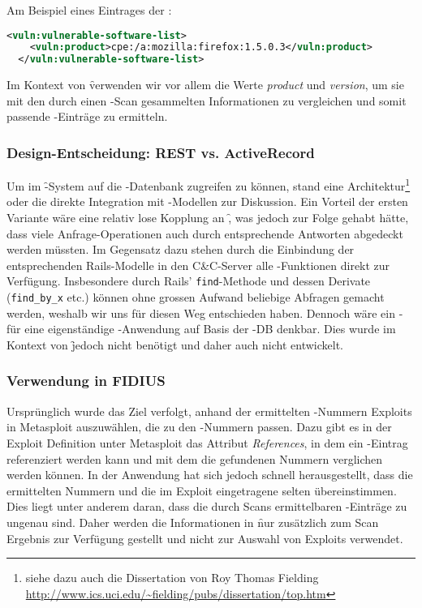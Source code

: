 Am Beispiel eines Eintrages der :

\begin{lstlisting}[language=XML]
  <vuln:vulnerable-software-list>
    <vuln:product>cpe:/a:mozilla:firefox:1.5.0.3</vuln:product>
  </vuln:vulnerable-software-list>
\end{lstlisting}

Im Kontext von \f verwenden wir vor allem die Werte \textit{product} und
\textit{version}, um sie mit den durch einen -Scan gesammelten
Informationen zu vergleichen und somit passende -Einträge zu ermitteln.

\subsubsection{Design-Entscheidung: REST vs. ActiveRecord}
\label{sec:design-entsch-rest}

Um im \f-System auf die -Datenbank zugreifen zu können, stand
eine 
Architektur\footnote{ siehe dazu auch die Dissertation von Roy Thomas
  Fielding \url{http://www.ics.uci.edu/~fielding/pubs/dissertation/top.htm}}
oder die direkte Integration mit -Modellen zur
Diskussion. Ein Vorteil der ersten Variante wäre eine relativ lose
Kopplung an \f, was jedoch zur Folge gehabt hätte, dass viele
Anfrage-Operationen auch durch entsprechende Antworten abgedeckt
werden müssten. Im Gegensatz dazu stehen durch die Einbindung der
entsprechenden Rails-Modelle in den C\&C-Server
alle -Funktionen direkt zur Verfügung. Insbesondere durch
Rails' \texttt{find}-Methode und dessen Derivate (\texttt{find\_by\_x} etc.)
können ohne grossen Aufwand beliebige Abfragen gemacht werden, weshalb
wir uns für diesen Weg entschieden haben. Dennoch wäre ein
- für eine eigenständige
-Anwendung auf Basis der -DB denkbar. Dies wurde im
Kontext von \f jedoch nicht benötigt und daher auch nicht entwickelt.

\subsubsection{Verwendung in FIDIUS}
\label{sec:use-in-fidius}

Ursprünglich wurde das Ziel verfolgt, anhand der ermittelten -Nummern
Exploits in Metasploit auszuwählen, die zu den -Nummern passen. Dazu
gibt es in der Exploit Definition unter Metasploit das Attribut
\textit{References}, in dem ein -Eintrag referenziert werden kann und
mit dem die gefundenen Nummern verglichen werden können. In der Anwendung hat
sich jedoch schnell herausgestellt, dass die ermittelten Nummern und die im
Exploit eingetragene selten übereinstimmen. Dies liegt unter anderem daran, dass
die durch  Scans ermittelbaren -Einträge zu ungenau sind.
Daher werden die Informationen in \f nur zusätzlich zum Scan Ergebnis zur
Verfügung gestellt und nicht zur Auswahl von Exploits verwendet.

